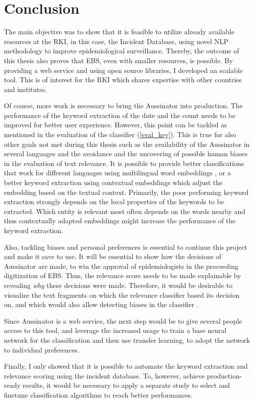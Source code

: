 \chapter{Conclusion}
  The main objective was to show that it is feasible to utilize already available resources at the RKI, in this case, the Incident Database, using novel NLP methodology to improve epidemiological surveillance.
  Thereby, the outcome of this thesis also proves that EBS, even with smaller resources, is possible.
  By providing a web service and using open source libraries, I developed an scalable tool. This is of interest for the RKI which shares expertise with other countries and institutes.


  Of course, more work is necessary to bring the Aussinator into production.
  The performance of the keyword extraction of the date and the count needs to be improved for better user experience.
  However, this point can be tackled as mentioned in the evaluation of the classifier (\ref{eval_key}).
  This is true for also other goals not met during this thesis such as the availability of the Aussinator in several languages and the avoidance and the uncovering of possible human biases in the evaluation of text relevance.
  It is possible to provide better classifications that work for different languages using multilingual word embeddings \citep{Chen2018}, or a better keyword extraction using contextual embeddings \citep{Devlin2018, Peters2018} which adjust the embedding based on the textual context.
  Primarily, the poor performing keyword extraction strongly depends on the local properties of the keywords to be extracted. Which entity is relevant most often depends on the words nearby and thus contextually adapted embeddings might increase the performance of the keyword extraction.

  Also, tackling biases and personal preferences is essential to continue this project and make it save to use.
  It will be essential to show how the decisions of Aussinator are made, to win the approval of epidemiologists in the proceeding digitization of EBS.
  Thus, the relevance score needs to be made explainable by revealing \emph{why} these decisions were made.
  Therefore, it would be desirable to visualize the text fragments on which the relevance classifier based its decision on, and which would also allow detecting biases in the classifier \citep{Arras2017}.

  Since Aussinator is a web service, the next step would be to give several people access to this tool, and leverage the increased usage to train a base neural network for the classification and then use transfer learning, to adopt the network to individual preferences.

  Finally, I only showed that it is possible to automate the keyword extraction and relevance scoring using the incident database.
  To, however, achieve production-ready results, it would be necessary to apply a separate study to select and finetune classification algorithms to reach better performances.
